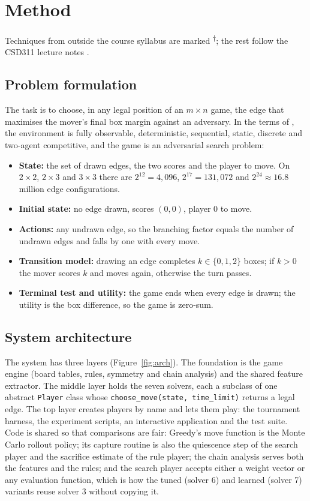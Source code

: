 \documentclass[11pt,a4paper]{article}
\newcommand{\bd}[2]{$#1{\times}#2$}            %
\newcommand{\outside}{\textsuperscript{$\dagger$}} %
\newcommand{\code}[1]{\texttt{#1}}
\begin{document}
\section{Method}
\label{sec:method}

Techniques from outside the course syllabus are marked \outside; the rest follow the
CSD311 lecture notes \cite{csd311notes}.

\subsection{Problem formulation}

The task is to choose, in any legal position of an $m\times n$ game, the edge that
maximises the mover's final box margin against an adversary. In the terms of
\cite{russell2020aima}, the environment is fully observable, deterministic, sequential,
static, discrete and two-agent competitive, and the game is an adversarial search problem:
\begin{itemize}
\item \textbf{State:} the set of drawn edges, the two scores and the player to move. On
  \bd{2}{2}, \bd{2}{3} and \bd{3}{3} there are $2^{12}=4{,}096$, $2^{17}=131{,}072$ and
  $2^{24}\approx 16.8$ million edge configurations.
\item \textbf{Initial state:} no edge drawn, scores $(0,0)$, player 0 to move.
\item \textbf{Actions:} any undrawn edge, so the branching factor equals the number of
  undrawn edges and falls by one with every move.
\item \textbf{Transition model:} drawing an edge completes $k\in\{0,1,2\}$ boxes; if $k>0$
  the mover scores $k$ and moves again, otherwise the turn passes.
\item \textbf{Terminal test and utility:} the game ends when every edge is drawn; the
  utility is the box difference, so the game is zero-sum.
\end{itemize}

\subsection{System architecture}

The system has three layers (Figure~\ref{fig:arch}). The foundation is the game engine
(board tables, rules, symmetry and chain analysis) and the shared feature extractor. The
middle layer holds the seven solvers, each a subclass of one abstract \code{Player} class
whose \code{choose\_move(state, time\_limit)} returns a legal edge. The top layer creates
players by name and lets them play: the tournament harness, the experiment scripts, an
interactive application and the test suite. Code is shared so that comparisons are fair:
Greedy's move function is the Monte Carlo rollout policy; its capture routine is also the
quiescence step of the search player and the sacrifice estimate of the rule player; the
chain analysis serves both the features and the rules; and the search player accepts
either a weight vector or any evaluation function, which is how the tuned (solver 6) and
learned (solver 7) variants reuse solver 3 without copying it.
\end{document}
